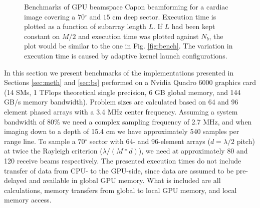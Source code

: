 \documentclass[journal]{IEEEtran}
\newcommand{\degree}{\ensuremath{^\circ}}
\begin{document}
\begin{figure}[!t]
\centerline{
\hfil
{}}
\caption{Benchmarks of GPU beamspace Capon beamforming for a cardiac image covering a $70 \degree$ and $15$ cm deep sector. Execution time is plotted as a function of subarray length $L$.  If $L$ had been kept constant on $M/2$ and execution time was plotted against $N_b$, the plot would be similar to the one in Fig. \ref{fig:bench}. The variation in execution time is caused by adaptive kernel launch configurations.}
\label{fig:benchBS}
\end{figure}
In this section we present benchmarks of the implementations presented in Sections \ref{sec:meth} and \ref{sec:bs} performed on a Nvidia Quadro 6000 graphics card (14 SMs, 1 TFlops theoretical single precision, 6 GB global memory, and 144 GB/s memory bandwidth). Problem sizes are calculated based on 64 and 96 element phased arrays with a 3.4 MHz center frequency. Assuming a system bandwidth of 80\% we need a complex sampling frequency of 2.7 MHz, and when imaging down to a depth of 15.4 cm we have approximately 540 samples per range line. To sample a $70\degree$ sector with 64- and 96-element arrays ($d=\lambda/2$ pitch) at twice the Rayleigh criterion ($\lambda/(M*d)$), we need at approximately 80 and 120 receive beams respectively. The presented execution times do not include transfer of data from CPU- to the GPU-side, since data are assumed to be pre-delayed and available in global GPU memory. What is included are all calculations, memory transfers from global to local GPU memory, and local memory access. 
\end{document}
